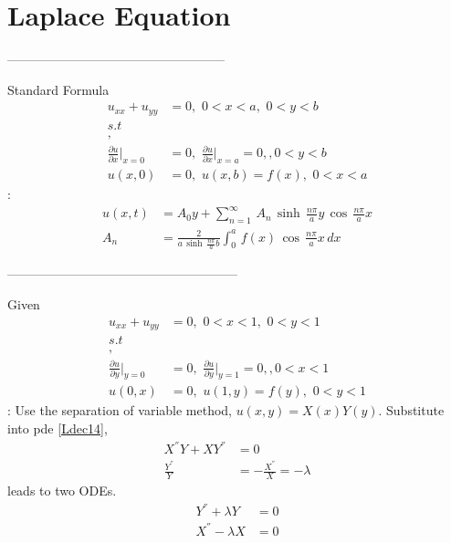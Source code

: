 \section{Laplace Equation}
\begin{center}
---------------------------------------------------
\end{center}
Standard Formula
\begin{align}
u_{xx}+u_{yy}&=0,\,\,0<x<a,\,\,0<y<b\label{Ldec14a}\\
s.t\,\\,&\nonumber\\
\frac{\partial u}{\partial x}\big|_{x=0}&=0,\,\,\frac{\partial u}{\partial x}\big|_{x=a}=0, , 0<y<b\label{bcl2a}\\
u(x,0)&=0,\,\,u(x,b)=f(x),\,\,0<x<a\label{bcl1a}
\end{align}
:
\begin{align}
u(x,t)&=A_0y+\sum_{n=1}^\infty\,A_n\,\sinh\,\frac{n\pi}{a}y\,\cos\,\frac{n\pi}{a}x\label{s1}\\
A_n&=\frac{2}{a\,\sinh\,\frac{n\pi}{a}b}\int_0^a\,f(x)\,\cos\,\frac{n\pi}{a}x\,dx\label{s2}
\end{align}
\begin{center}
------------------------------------------------------
\end{center}
Given
\begin{align}
u_{xx}+u_{yy}&=0,\,\,0<x<1,\,\,0<y<1\label{Ldec14}\\
s.t\,\\,&\nonumber\\
\frac{\partial u}{\partial y}\big|_{y=0}&=0,\,\,\frac{\partial u}{\partial y}\big|_{y=1}=0, , 0<x<1\label{bcl2}\\
u(0,x)&=0,\,\,u(1,y)=f(y),\,\,0<y<1\label{bcl1}
\end{align}
:
Use the separation of variable method, $u(x,y)=X(x)Y(y)$. Substitute into pde \eqref{Ldec14},
\begin{align*}
X^{''}Y+XY^{''}&=0\\
\frac{Y^{''}}{Y}&=-\frac{X^{''}}{X}=-\lambda
\end{align*}
leads to two ODEs.
\begin{align}
Y^{''}+\lambda Y&=0\label{Lap1}\\
X^{''}-\lambda X&=0\label{Lap2}
\end{align}
